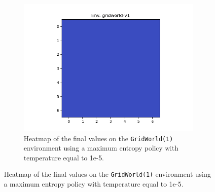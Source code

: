 \documentclass{article}
\begin{document}
\begin{enumerate}[(a)]
\begin{figure}[h!]
\begin{subfigure}{0.3\textwidth}
    \end{subfigure}
    \hspace{0.1 in}
     \begin{subfigure}{0.3\textwidth}
        \centering
        \includegraphics[width=\textwidth]{../figures/gridworld-v1_maxent_t2.png}
        \caption{Heatmap of the final values on the \texttt{GridWorld(1)} environment using a maximum entropy policy with temperature equal to 1e-5.}
    \end{subfigure}
\end{figure}


\end{enumerate}

\newpage
\end{document}
